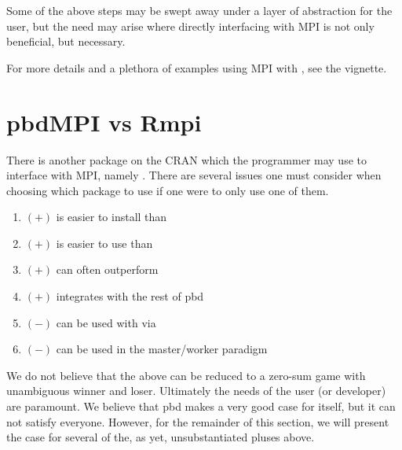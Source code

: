 Some of the above steps may be swept away under a layer of abstraction for the user, but the need may arise where directly interfacing with MPI is not only beneficial, but necessary.

For more details and a plethora of examples using MPI with , see the  vignette.

\section{pbdMPI vs Rmpi}

There is another package on the CRAN which the  programmer may use to interface with MPI, namely  \citep{Rmpi}.  There are several issues one must consider when choosing which package to use if one were to only use one of them.
\begin{enumerate}
 \item $(+)$  is easier to install than 
 \item $(+)$  is easier to use than 
 \item\label{enum:perf} $(+)$  can often outperform 
 \item\label{enum:integrate} $(+)$  integrates with the rest of pbd
 \item\label{enum:dompi} $(-)$  can be used with  \citep{foreach} via  \citep{dompi}
 \item $(-)$  can be used in the master/worker paradigm
\end{enumerate}

We do not believe that the above can be reduced to a zero-sum game with unambiguous winner and loser.  Ultimately the needs of the user (or developer) are paramount.  We believe that pbd makes a very good case for itself, but it can not satisfy everyone.  However, for the remainder of this section, we will present the case for several of the, as yet, unsubstantiated pluses above.


